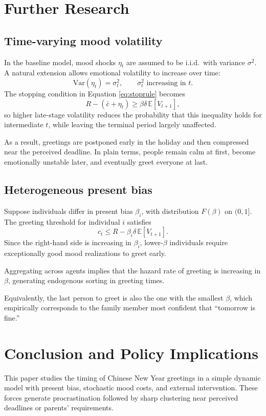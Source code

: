 \documentclass[AER]{AEA}
\newcommand{\E}{\mathbb{E}}
\newcommand{\Var}{\mathrm{Var}}
\begin{document}
\section{Further Research}

\subsection{Time-varying mood volatility}
In the baseline model, mood shocks $\eta_t$ are assumed to be i.i.d.\ with variance $\sigma^2$. A natural extension allows emotional volatility to increase over time:
\[
\Var(\eta_t)=\sigma_t^2,\qquad \sigma_t^2 \text{ increasing in } t.
\]
The stopping condition in Equation \eqref{eq:stoprule} becomes
\[
R - (\bar c + \eta_t) \ge \beta\delta\, \E[V_{t+1}],
\]
so higher late-stage volatility reduces the probability that this inequality holds for intermediate $t$, while leaving the terminal period largely unaffected.

As a result, greetings are postponed early in the holiday and then compressed near the perceived deadline. In plain terms, people remain calm at first, become emotionally unstable later, and eventually greet everyone at last.

\subsection{Heterogeneous present bias}
Suppose individuals differ in present bias $\beta_i$, with distribution $F(\beta)$ on $(0,1]$. The greeting threshold for individual $i$ satisfies
\[
c_t \le R - \beta_i \delta\, \E[V_{t+1}].
\]
Since the right-hand side is increasing in $\beta_i$, lower-$\beta$ individuals require exceptionally good mood realizations to greet early.

Aggregating across agents implies that the hazard rate of greeting is increasing in $\beta$, generating endogenous sorting in greeting times.

Equivalently, the last person to greet is also the one with the smallest $\beta$, which empirically corresponds to the family member most confident that ``tomorrow is fine.''

\section{Conclusion and Policy Implications}
This paper studies the timing of Chinese New Year greetings in a simple dynamic model with present bias, stochastic mood costs, and external intervention. These forces generate procrastination followed by sharp clustering near perceived deadlines or parents' requirements.
\end{document}
